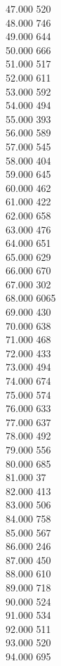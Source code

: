 { 47.000	520 \\
 48.000	746 \\
 49.000	644 \\
 50.000	666 \\
 51.000	517 \\
 52.000	611 \\
 53.000	592 \\
 54.000	494 \\
 55.000	393 \\
 56.000	589 \\
 57.000	545 \\
 58.000	404 \\
 59.000	645 \\
 60.000	462 \\
 61.000	422 \\
 62.000	658 \\
 63.000	476 \\
 64.000	651 \\
 65.000	629 \\
 66.000	670 \\
 67.000	302 \\
 68.000	6065 \\
 69.000	430 \\
 70.000	638 \\
 71.000	468 \\
 72.000	433 \\
 73.000	494 \\
 74.000	674 \\
 75.000	574 \\
 76.000	633 \\
 77.000	637 \\
 78.000	492 \\
 79.000	556 \\
 80.000	685 \\
 81.000	37 \\
 82.000	413 \\
 83.000	506 \\
 84.000	758 \\
 85.000	567 \\
 86.000	246 \\
 87.000	450 \\
 88.000	610 \\
 89.000	718 \\
 90.000	524 \\
 91.000	534 \\
 92.000	511 \\
 93.000	520 \\
 94.000	695 \\
}
